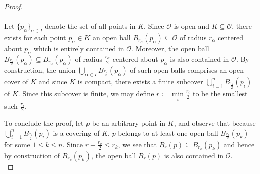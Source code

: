 \begin{proof}\ \\\\
   Let $\{p_\alpha\}_{\alpha \in I}$ denote the set of all points in $K$. Since $\mathcal{O}$ is open
   and $K \subseteq \mathcal{O}$, there exists for each point $p_{\alpha} \in K$ an open ball 
   $B_{r_{\alpha}}(p_{\alpha}) \subseteq \mathcal{O}$ of radius $r_{\alpha}$ centered about $p_{\alpha}$ which is 
   entirely contained in $\mathcal{O}$. Moreover, the open ball 
   $B_{\tfrac{r_{\alpha}}{2}}(p_{\alpha}) \subseteq B_{r_{\alpha}}(p_{\alpha})$ of radius $\tfrac{r_{\alpha}}{2}$ 
   centered about $p_{\alpha}$ is also contained in $\mathcal{O}$. By construction, the union 
   $\bigcup\limits_{\alpha \in I}{B_{\tfrac{r_{\alpha}}{2}}}(p_{\alpha})$ of such open balls comprises an open cover
   of $K$ and since $K$ is compact, there exists a finite subcover 
   $\bigcup\limits_{i=1}^{n}{B_{\tfrac{r_i}{2}}}(p_i)$ of $K$. Since this subcover is finite, we may define 
   $r \coloneqq \min\limits_i{\tfrac{r_i}{2}}$ to be the smallest such $\frac{r_i}{2}$.

   To conclude the proof, let $p$ be an arbitrary point in $K$, and observe that because 
   $\bigcup\limits_{i=1}^{n}{B_{\tfrac{r_i}{2}}}(p_i)$ is a covering of $K$, $p$ belongs to at least one open ball
   $B_{\tfrac{r_k}{2}}(p_k)$ for some $1 \le k \le n$. Since $r + \frac{r_k}{2} \le r_k$, we see that 
   $B_r(p) \subseteq B_{r_k}(p_k)$ and hence by construction of $B_{r_k}(p_k)$, the open ball $B_r(p)$ is also contained
   in $\mathcal{O}$.
   \ \\
\end{proof}

\pagebreak